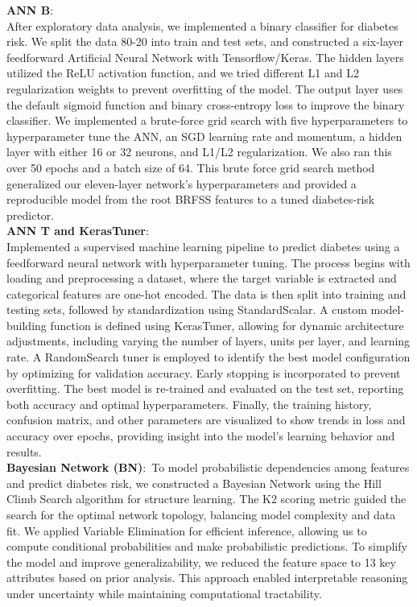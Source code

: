 \documentclass[conference]{IEEEtran}
\begin{document}
\noindent
\textbf{ANN B}:\\
After exploratory data analysis, we implemented a binary classifier for diabetes risk. We split the data 80-20 into train and test sets, and constructed a six-layer feedforward Artificial Neural Network with Tensorflow/Keras. The hidden layers utilized the ReLU activation function, and we tried different L1 and L2 regularization weights to prevent overfitting of the model. The output layer uses the default sigmoid function and binary cross-entropy loss to improve the binary classifier. We implemented a brute-force grid search with five hyperparameters to hyperparameter tune the ANN, an SGD learning rate and momentum, a hidden layer with either 16 or 32 neurons, and L1/L2 regularization. We also ran this over 50 epochs and a batch size of 64.
This brute force grid search method generalized our eleven-layer network’s hyperparameters and provided a reproducible model from the root BRFSS features to a tuned diabetes‐risk predictor.\\ 


\noindent
\textbf{ANN T and KerasTuner}:\\
Implemented a supervised machine learning pipeline to predict diabetes using a feedforward neural network with hyperparameter tuning. The process begins with loading and preprocessing a dataset, where the target variable is extracted and categorical features are one-hot encoded. The data is then split into training and testing sets, followed by standardization using StandardScalar. A custom model-building function is defined using KerasTuner, allowing for dynamic architecture adjustments, including varying the number of layers, units per layer, and learning rate. A RandomSearch tuner is employed to identify the best model configuration by optimizing for validation accuracy. Early stopping is incorporated to prevent overfitting. The best model is re-trained and evaluated on the test set, reporting both accuracy and optimal hyperparameters. Finally, the training history, confusion matrix, and other parameters are visualized to show trends in loss and accuracy over epochs, providing insight into the model's learning behavior and results.\\

\noindent
\textbf{Bayesian Network (BN)}:\
To model probabilistic dependencies among features and predict diabetes risk, we constructed a Bayesian Network using the Hill Climb Search algorithm for structure learning. The K2 scoring metric guided the search for the optimal network topology, balancing model complexity and data fit. We applied Variable Elimination for efficient inference, allowing us to compute conditional probabilities and make probabilistic predictions. To simplify the model and improve generalizability, we reduced the feature space to 13 key attributes based on prior analysis. This approach enabled interpretable reasoning under uncertainty while maintaining computational tractability.
\end{document}
